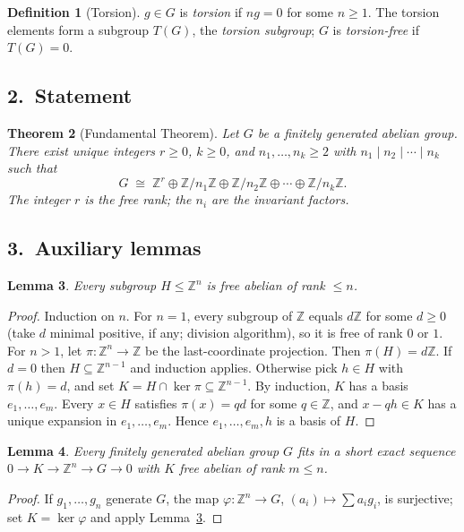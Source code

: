 \documentclass{article}
\newtheorem{theorem}{Theorem}
\newtheorem{lemma}[theorem]{Lemma}
\theoremstyle{definition}
\newtheorem{definition}[theorem]{Definition}
\begin{document}
\begin{definition}[Torsion]
$g\in G$ is \emph{torsion} if $ng=0$ for some $n\ge 1$. The torsion
elements form a subgroup $T(G)$, the \emph{torsion subgroup}; $G$ is
\emph{torsion-free} if $T(G)=0$.
\end{definition}

\subsection*{2.\ Statement}

\begin{theorem}[Fundamental Theorem]\label{thm:main}
Let $G$ be a finitely generated abelian group. There exist unique
integers $r\ge 0$, $k\ge 0$, and $n_1,\dots,n_k\ge 2$ with
$n_1\mid n_2\mid\cdots\mid n_k$ such that
\[
  G\;\cong\;\mathbb{Z}^r\oplus\mathbb{Z}/n_1\mathbb{Z}\oplus\mathbb{Z}/n_2\mathbb{Z}
  \oplus\cdots\oplus\mathbb{Z}/n_k\mathbb{Z}.
\]
The integer $r$ is the \emph{free rank}; the $n_i$ are the
\emph{invariant factors}.
\end{theorem}

\subsection*{3.\ Auxiliary lemmas}

\begin{lemma}\label{lem:fgfree}
Every subgroup $H\le\mathbb{Z}^n$ is free abelian of rank $\le n$.
\end{lemma}
\begin{proof}
Induction on $n$. For $n=1$, every subgroup of $\mathbb{Z}$ equals $d\mathbb{Z}$
for some $d\ge 0$ (take $d$ minimal positive, if any; division
algorithm), so it is free of rank $0$ or $1$. For $n>1$, let
$\pi:\mathbb{Z}^n\to\mathbb{Z}$ be the last-coordinate projection. Then
$\pi(H)=d\mathbb{Z}$. If $d=0$ then $H\subseteq\mathbb{Z}^{n-1}$ and induction
applies. Otherwise pick $h\in H$ with $\pi(h)=d$, and set
$K=H\cap\ker\pi\subseteq\mathbb{Z}^{n-1}$. By induction, $K$ has a basis
$e_1,\dots,e_m$. Every $x\in H$ satisfies $\pi(x)=qd$ for some
$q\in\mathbb{Z}$, and $x-qh\in K$ has a unique expansion in
$e_1,\dots,e_m$. Hence $e_1,\dots,e_m,h$ is a basis of $H$.
\end{proof}

\begin{lemma}\label{lem:pres}
Every finitely generated abelian group $G$ fits in a short exact
sequence $0\to K\to\mathbb{Z}^n\to G\to 0$ with $K$ free abelian of rank
$m\le n$.
\end{lemma}
\begin{proof}
If $g_1,\dots,g_n$ generate $G$, the map $\varphi:\mathbb{Z}^n\to G$,
$(a_i)\mapsto\sum a_ig_i$, is surjective; set $K=\ker\varphi$ and
apply Lemma~\ref{lem:fgfree}.
\end{proof}
\end{document}
